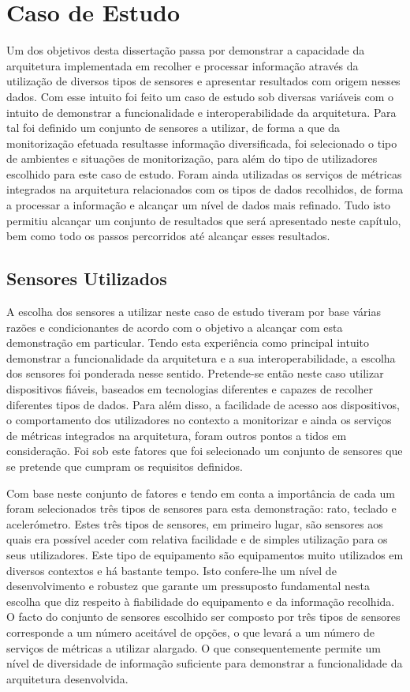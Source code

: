 \chapter{Caso de Estudo}

Um dos objetivos desta dissertação passa por demonstrar a capacidade da arquitetura implementada em recolher e processar informação através da utilização de diversos tipos de sensores e apresentar resultados com origem nesses dados. Com esse intuito foi feito um caso de estudo sob diversas variáveis com o intuito de demonstrar a funcionalidade e interoperabilidade da arquitetura. Para tal foi definido um conjunto de sensores a utilizar, de forma a que da monitorização efetuada resultasse informação diversificada, foi selecionado o tipo de ambientes e situações de monitorização, para além do tipo de utilizadores escolhido para este caso de estudo. Foram ainda utilizadas os serviços de métricas integrados na arquitetura relacionados com os tipos de dados recolhidos, de forma a processar a informação e alcançar um nível de dados mais refinado. Tudo isto permitiu alcançar um conjunto de resultados que será apresentado neste capítulo, bem como todo os passos percorridos até alcançar esses resultados.


\section{Sensores Utilizados}

A escolha dos sensores a utilizar neste caso de estudo tiveram por base várias razões e condicionantes de acordo com o objetivo a alcançar com esta demonstração em particular. Tendo esta experiência como principal intuito demonstrar a funcionalidade da arquitetura e a sua interoperabilidade, a escolha dos sensores foi ponderada nesse sentido. Pretende-se então neste caso utilizar dispositivos fiáveis, baseados em tecnologias diferentes e capazes de recolher diferentes tipos de dados. Para além disso, a facilidade de acesso aos dispositivos, o comportamento dos utilizadores no contexto a monitorizar e ainda os serviços de métricas integrados na arquitetura, foram outros pontos a tidos em consideração. Foi sob este fatores que foi selecionado um conjunto de sensores que se pretende que cumpram os requisitos definidos.

Com base neste conjunto de fatores e tendo em conta a importância de cada um foram selecionados três tipos de sensores para esta demonstração: rato, teclado e acelerómetro. Estes três tipos de sensores, em primeiro lugar, são sensores aos quais era possível aceder com relativa facilidade e de simples utilização para os seus utilizadores. Este tipo de equipamento são equipamentos muito utilizados em diversos contextos e há bastante tempo. Isto confere-lhe um nível de desenvolvimento e robustez que garante um pressuposto fundamental nesta escolha que diz respeito à fiabilidade do equipamento e da informação recolhida. O facto do conjunto de sensores escolhido ser composto por três tipos de sensores corresponde a um número aceitável de opções, o que levará a um número de serviços de métricas a utilizar alargado. O que consequentemente permite um nível de diversidade de informação suficiente para demonstrar a funcionalidade da arquitetura desenvolvida.

